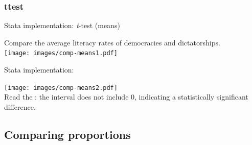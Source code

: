 \documentclass{beamer}
\begin{document}
	\subsubsection{ttest}

	\begin{frame}[t]{Stata implementation: \textit{t}-test (means)}

	Compare the average literacy rates of democracies and dictatorships.\\[1em]
	
	\texttt{[image: images/comp-means1.pdf]}
	\end{frame}

	\begin{frame}[t]{Stata implementation: }
	
	\texttt{[image: images/comp-means2.pdf]}\\[1em]
	
	Read the : the interval does not include 0, indicating a statistically significant difference.
	\end{frame}
	
	\subsection{Comparing proportions}
\end{document}
